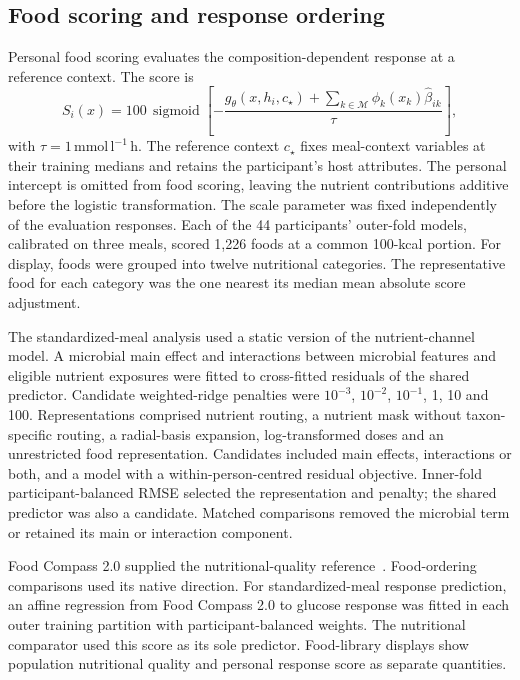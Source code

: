 \documentclass[pdflatex,sn-nature]{sn-jnl}
\newcommand{\aucunit}{\mathrm{mmol\,l^{-1}\,h}}
\newcommand{\sigmoid}{\operatorname{sigmoid}}
\theoremstyle{thmstyleone}
\theoremstyle{thmstyletwo}
\theoremstyle{thmstylethree}
\begin{document}
\subsection{Food scoring and response ordering}

Personal food scoring evaluates the composition-dependent response at a reference context. The score is
\begin{equation}
S_i(x)=100\,\sigmoid\!\left[-\frac{g_\theta(x,h_i,c_\star)+\sum_{k\in\mathcal M}\phi_k(x_k)\widehat\beta_{ik}}{\tau}\right],
\label{eq:score}
\end{equation}
with $\tau=1\,\aucunit$. The reference context $c_\star$ fixes meal-context variables at their training medians and retains the participant's host attributes. The personal intercept is omitted from food scoring, leaving the nutrient contributions additive before the logistic transformation. The scale parameter was fixed independently of the evaluation responses. Each of the 44 participants' outer-fold models, calibrated on three meals, scored 1,226 foods at a common 100-kcal portion. For display, foods were grouped into twelve nutritional categories. The representative food for each category was the one nearest its median mean absolute score adjustment.

The standardized-meal analysis used a static version of the nutrient-channel model. A microbial main effect and interactions between microbial features and eligible nutrient exposures were fitted to cross-fitted residuals of the shared predictor. Candidate weighted-ridge penalties were $10^{-3}$, $10^{-2}$, $10^{-1}$, 1, 10 and 100. Representations comprised nutrient routing, a nutrient mask without taxon-specific routing, a radial-basis expansion, log-transformed doses and an unrestricted food representation. Candidates included main effects, interactions or both, and a model with a within-person-centred residual objective. Inner-fold participant-balanced RMSE selected the representation and penalty; the shared predictor was also a candidate. Matched comparisons removed the microbial term or retained its main or interaction component.

Food Compass 2.0 supplied the nutritional-quality reference~\cite{barrett}. Food-ordering comparisons used its native direction. For standardized-meal response prediction, an affine regression from Food Compass 2.0 to glucose response was fitted in each outer training partition with participant-balanced weights. The nutritional comparator used this score as its sole predictor. Food-library displays show population nutritional quality and personal response score as separate quantities.
\end{document}
